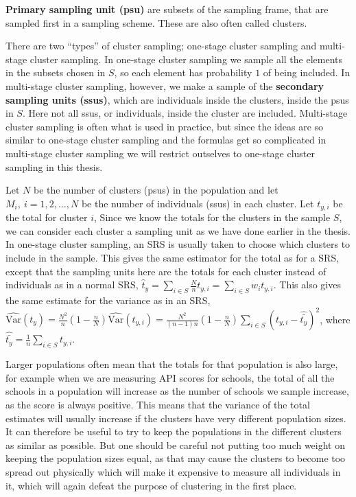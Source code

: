 \documentclass{article}
\begin{document}
\begin{definition}
 \textbf{Primary sampling unit (psu)} are subsets of the sampling frame, that
 are sampled first in a sampling scheme. These are also often called clusters. 
\end{definition}

There are two ``types'' of cluster sampling; one-stage cluster sampling and
multi-stage cluster sampling. In one-stage cluster sampling we sample all the
elements in the subsets chosen in \(S\), so each element has probability \(1\)
of being included. In multi-stage cluster sampling, however,
we make a sample of the \textbf{secondary sampling units (ssus)}, which are
individuals inside the clusters, inside the psus in \(S\). Here not all ssus, or
individuals, inside the cluster are included. Multi-stage cluster sampling is often what is used in
practice, but since the ideas are so similar to one-stage cluster sampling and
the formulas get so complicated in multi-stage cluster sampling
we will restrict outselves to one-stage cluster sampling in this thesis.

Let \(N\) be the number of clusters (psus) in the population and let \(M_i,\ i =
1, 2, \dots, N\) be the number of individuals (ssus) in each cluster. Let
\(t_{y, i}\) be the total for cluster \(i\), Since we know the totals for the
clusters in the sample \(S\), we can consider each cluster a sampling unit as we
have done earlier in the thesis. In one-stage cluster sampling, an SRS is
usually taken to choose which clusters to include in the sample. This gives the
same estimator for the total as for a SRS, except that the sampling units here
are the totals for each cluster instead of individuals as in a normal SRS,
\(\hat{t}_y = \sum_{i \in S} \frac{N}{n} t_{y, i} = \sum_{i \in S} w_i t_{y, i} \). 
This also gives the same estimate for the variance as in an SRS,
\(\widehat{\mathrm{Var}}\left(t_{y}\right) = \frac{N^2}{n} \left( 1 - \frac{n}{N}
\right) \hat{\mathrm{Var}}\left( t_{y, i} \right) =
\frac{N^2}{\left( n - 1 \right)n} \left( 1 - \frac{n}{N} \right) \sum_{i \in S}
\left( t_{y, i} - \hat{\bar{t_y}} \right)^2\), where \(\hat{\bar{t_y}} =
\frac{1}{n} \sum_{i \in S} t_{y, i}\).

Larger populations often mean that the totals for that population is also large,
for example when we are measuring API scores for schools, the total of all the
schools in a population will increase as the number of schools we sample
increase, as the score is always positive. This means that the variance of the
total estimates will usually increase if the clusters have very different
population sizes. It can therefore be useful to try to keep the populations in
the different clusters as similar as possible. But one should be careful not
putting too much weight on keeping the population sizes equal, as that may cause
the clusters to become too spread out physically which will make it expensive to
measure all individuals in it, which will again defeat the purpose of clustering
in the first place.
\end{document}
